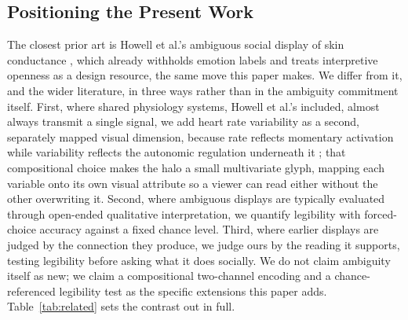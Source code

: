\documentclass[manuscript,review,anonymous]{acmart}
\begin{document}
\subsection{Positioning the Present Work}
The closest prior art is Howell et al.'s ambiguous social display of skin conductance \cite{howell_biosignals_2016}, which already withholds emotion labels and treats interpretive openness as a design resource, the same move this paper makes. We differ from it, and the wider literature, in three ways rather than in the ambiguity commitment itself. First, where shared physiology systems, Howell et al.'s included, almost always transmit a single signal, we add heart rate variability as a second, separately mapped visual dimension, because rate reflects momentary activation while variability reflects the autonomic regulation underneath it \cite{thayer_model_2000, porges_polyvagal_2007}; that compositional choice makes the halo a small multivariate glyph, mapping each variable onto its own visual attribute so a viewer can read either without the other overwriting it. Second, where ambiguous displays are typically evaluated through open-ended qualitative interpretation, we quantify legibility with forced-choice accuracy against a fixed chance level. Third, where earlier displays are judged by the connection they produce, we judge ours by the reading it supports, testing legibility before asking what it does socially. We do not claim ambiguity itself as new; we claim a compositional two-channel encoding and a chance-referenced legibility test as the specific extensions this paper adds. Table~\ref{tab:related} sets the contrast out in full.
\end{document}
